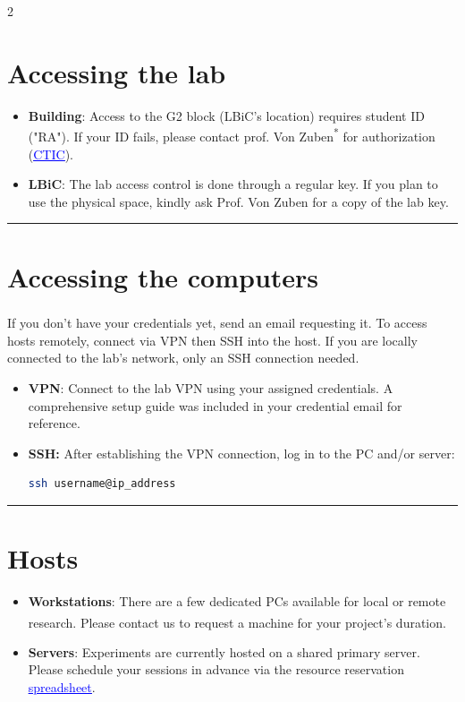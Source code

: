 \documentclass[a4paper, landscape]{article}
\begin{document}
\begin{multicols}{2}
\raggedcolumns
\section*{Accessing the lab}
\label{sec:orgc30ec46}
\vspace{-0.1cm}
\begin{itemize}
\item \textbf{Building}: Access to the G2 block (LBiC's location) requires student ID ("RA"). If your ID fails, please contact prof. Von Zuben\textsuperscript{*} for authorization (\href{https://site.fee.unicamp.br/ctic/faq\detokenize{#}acesso_laboratorio}{\textcolor{blue}{\uline{CTIC}}}).
\item \textbf{LBiC}: The lab access control is done through a regular key. If you plan to use the physical space, kindly ask Prof. Von Zuben for a copy of the lab key.
\end{itemize}
\vspace{-1em}\noindent\rule{\linewidth}{0.4pt}\vspace{-1em}
\section*{Accessing the computers}
\label{sec:org7614af6}
\vspace{-0.1cm}
If you don't have your credentials yet, send an email\textsuperscript{\dag}  requesting it. To access hosts remotely, connect via VPN then SSH into the host. If you are locally connected to the lab's network, only an SSH connection needed.
\begin{itemize}
\item \textbf{VPN}: Connect to the lab VPN using your assigned credentials. A comprehensive setup guide was included in your credential email for reference.
\item \textbf{SSH:} After establishing the VPN connection, log in to the PC and/or server:
\begin{lstlisting}[language=sh,numbers=none]
  ssh username@ip_address
\end{lstlisting}
\end{itemize}
\vspace{-1em}\noindent\rule{\linewidth}{0.4pt}\vspace{-1em}
\section*{Hosts}
\label{sec:org8bbbf16}
\vspace{-0.1cm}
\begin{itemize}
\item \textbf{Workstations}: There are a few dedicated PCs available for local or remote research. Please contact us\textsuperscript{\dag} to request a machine for your project's duration.
\item \textbf{Servers}: Experiments are currently hosted on a shared primary server. Please schedule your sessions in advance via the resource reservation \href{https://docs.google.com/spreadsheets/d/1Lhi5pEze4d4Z4oHMksUpD3k6n5Hp26gXtOMGz6sXr9A/edit?usp=sharing}{\textcolor{blue}{\uline{spreadsheet}}}.
\end{itemize}


\end{multicols}
\end{document}
